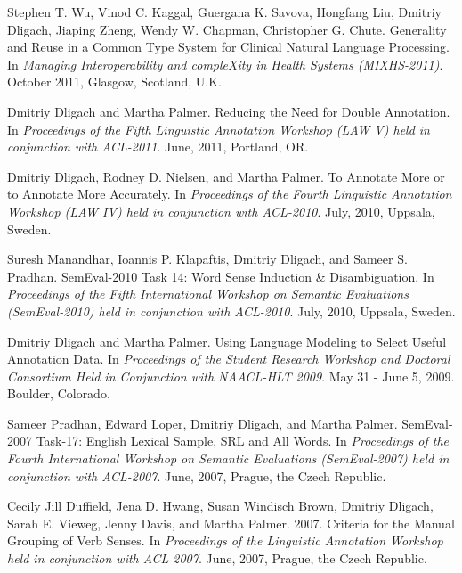 \documentclass[letterpaper]{article}
\renewenvironment{itemize}{
  \begin{list}{}{
    \setlength{\leftmargin}{1.5em}
  }
}{
  \end{list}
}
\begin{document}
\begin{itemize}
\item Stephen T. Wu, Vinod C. Kaggal, Guergana K. Savova, Hongfang Liu, Dmitriy Dligach, Jiaping Zheng, Wendy W. Chapman, Christopher G. Chute. Generality and Reuse in a Common Type System for Clinical Natural Language Processing. In \emph{Managing Interoperability and compleXity in Health Systems (MIXHS-2011)}. October 2011, Glasgow, Scotland, U.K.
\item Dmitriy Dligach and Martha Palmer. Reducing the Need for Double Annotation. In \emph{Proceedings of the Fifth Linguistic Annotation Workshop (LAW V) held in conjunction with ACL-2011}. June, 2011, Portland, OR.
\item Dmitriy Dligach, Rodney D. Nielsen, and Martha Palmer. To Annotate More or to Annotate More Accurately. In \emph{Proceedings of the Fourth Linguistic Annotation Workshop (LAW IV) held in conjunction with ACL-2010}. July, 2010, Uppsala, Sweden.
\item Suresh Manandhar, Ioannis P. Klapaftis, Dmitriy Dligach, and Sameer S. Pradhan. SemEval-2010 Task 14: Word Sense Induction \& Disambiguation. In \emph{Proceedings of the Fifth International Workshop on Semantic Evaluations (SemEval-2010) held in conjunction with ACL-2010}. July, 2010, Uppsala, Sweden.
\item Dmitriy Dligach and Martha Palmer. Using Language Modeling to Select Useful Annotation Data. In \emph {Proceedings of the Student Research Workshop and Doctoral Consortium Held in Conjunction with NAACL-HLT 2009}. May 31 - June 5, 2009. Boulder, Colorado.
\item Sameer Pradhan, Edward Loper, Dmitriy Dligach, and Martha Palmer. SemEval-2007 Task-17: English Lexical Sample, SRL and All Words. In \emph {Proceedings of the Fourth International Workshop on Semantic Evaluations (SemEval-2007) held in conjunction with ACL-2007}. June, 2007, Prague, the Czech Republic.
\item Cecily Jill Duffield, Jena D. Hwang, Susan Windisch Brown, Dmitriy Dligach, Sarah E. Vieweg, Jenny Davis, and Martha Palmer. 2007. Criteria for the Manual Grouping of Verb Senses. In \emph {Proceedings of the Linguistic Annotation Workshop held in conjunction with ACL 2007}. June, 2007, Prague, the Czech Republic.
\end{itemize}
\end{document}
